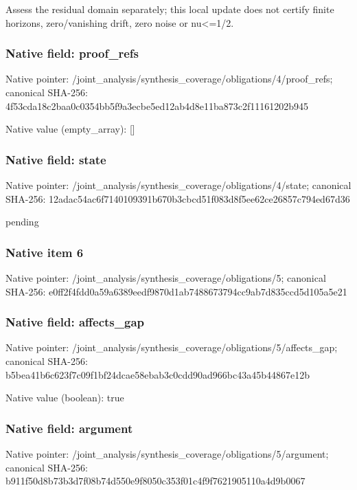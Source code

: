 \documentclass[10pt,a4paper]{article}
\begin{document}
\begingroup\raggedright\sloppy Assess the residual domain separately;\allowbreak{} this local update does not certify finite horizons,\allowbreak{} zero/\allowbreak{}vanishing drift,\allowbreak{} zero noise or nu<=\allowbreak{}1/\allowbreak{}2.\par\endgroup

\subsubsection{Native field: proof\_\allowbreak{}refs}
Native pointer: /joint\_\allowbreak{}analysis/synthesis\_\allowbreak{}coverage/obligations/4/proof\_\allowbreak{}refs; canonical SHA-256: 4f53cda18c2baa0c0354bb5f9a3ecbe5ed12ab4d8e11ba873c2f11161202b945

Native value (empty\_\allowbreak{}array): []

\subsubsection{Native field: state}
Native pointer: /joint\_\allowbreak{}analysis/synthesis\_\allowbreak{}coverage/obligations/4/state; canonical SHA-256: 12adac54ac6f7140109391b670b3cbcd51f083d8f5ee62ce26857c794ed67d36

\begingroup\raggedright\sloppy pending\par\endgroup

\subsubsection{Native item 6}
Native pointer: /joint\_\allowbreak{}analysis/synthesis\_\allowbreak{}coverage/obligations/5; canonical SHA-256: e0ff2f4fdd0a59a6389eedf9870d1ab7488673794cc9ab7d835ccd5d105a5e21

\subsubsection{Native field: affects\_\allowbreak{}gap}
Native pointer: /joint\_\allowbreak{}analysis/synthesis\_\allowbreak{}coverage/obligations/5/affects\_\allowbreak{}gap; canonical SHA-256: b5bea41b6c623f7c09f1bf24dcae58ebab3c0cdd90ad966bc43a45b44867e12b

Native value (boolean): true

\subsubsection{Native field: argument}
Native pointer: /joint\_\allowbreak{}analysis/synthesis\_\allowbreak{}coverage/obligations/5/argument; canonical SHA-256: b911f50d8b73b3d7f08b74d550e9f8050c353f01c4f9f7621905110a4d9b0067
\end{document}
